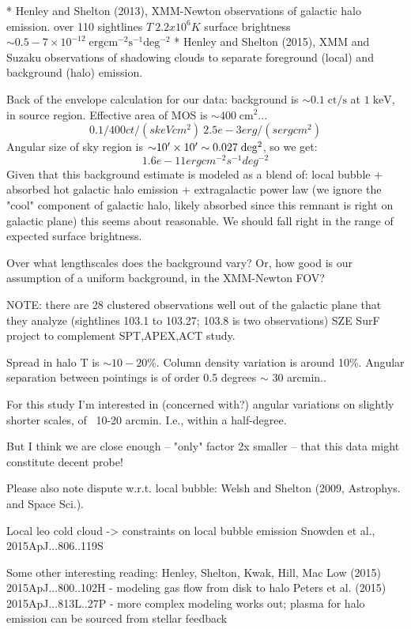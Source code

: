 \documentclass[manuscript]{aastex6}  %
\newcommand*{\mt}{\mathrm}
\newcommand*{\unit}[1]{\;\mt{#1}}  %
\newcommand*{\abt}{\mathord{\sim}} %
\begin{document}
* Henley and Shelton (2013), XMM-Newton observations of galactic halo emission.
  over 110 sightlines
    $T ~ 2.2 x 10^6 K$
    surface brightness $\abt 0.5-7 \times 10^{-12} \unit{erg cm^{-2} s^{-1} deg^{-2}}$
* Henley and Shelton (2015), XMM and Suzaku observations of shadowing clouds
  to separate foreground (local) and background (halo) emission.

Back of the envelope calculation for our data:
background is $\abt0.1 \unit{ct/s}$ at $1 \unit{keV}$, in source region.
Effective area of MOS is $\abt400 \unit{cm^2}$...
\[
    0.1/400 ct/(s keV cm^2) ~ 2.5e-3 erg / (s erg cm^2)
\]
Angular size of sky region is $\abt 10\arcmin \times 10\arcmin \sim 0.027 \unit{deg^2}$, so we get:
\[
    1.6e-11 erg cm^{-2} s^{-1} deg^{-2}
\]
Given that this background estimate is modeled as a blend of:
local bubble + absorbed hot galactic halo emission + extragalactic power law
(we ignore the "cool" component of galactic halo, likely absorbed since
this remnant is right on galactic plane)
this seems about reasonable.  We should fall right in the range of expected
surface brightness.


Over what lengthscales does the background vary?  Or, how good is our
assumption of a uniform background, in the XMM-Newton FOV?

NOTE: there are 28 clustered observations well out of the galactic plane
that they analyze (sightlines 103.1 to 103.27; 103.8 is two observations)
SZE SurF project to complement SPT,APEX,ACT study.

    Spread in halo T is $\abt10-20\%$.  Column density variation is around 10\%.
    Angular separation between pointings is of order 0.5 degrees $\sim$ 30 arcmin..

    For this study I'm interested in (concerned with?)
    angular variations on slightly shorter scales, of ~10-20 arcmin.  I.e.,
    within a half-degree.

    But I think we are close enough -- "only" factor 2x smaller -- that this
    data might constitute decent probe!



Please also note dispute w.r.t. local bubble: Welsh and Shelton (2009,
Astrophys. and Space Sci.).

Local leo cold cloud -> constraints on local bubble emission
Snowden et al., 2015ApJ...806..119S

Some other interesting reading:
Henley, Shelton, Kwak, Hill, Mac Low (2015) 2015ApJ...800..102H
- modeling gas flow from disk to halo
Peters et al. (2015) 2015ApJ...813L..27P
- more complex modeling works out; plasma for halo emission can be sourced from
  stellar feedback
\end{document}
